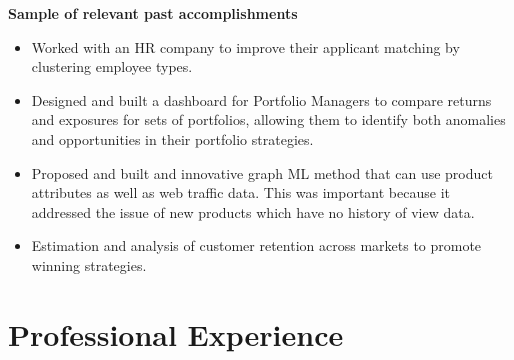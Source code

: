 \documentclass[10pt, letterpaper]{article} %
\begin{document}
\vspace{-10pt}
 {\textbf {Sample of relevant past accomplishments}}  
 \vspace{-3pt}
\begin{itemize}
\item Worked with an HR company to improve their applicant matching by clustering employee types.
\item Designed and built a dashboard for Portfolio Managers to compare returns and exposures for sets of portfolios, allowing them to identify both anomalies and opportunities in their portfolio strategies. 
 \item  Proposed and built and innovative graph ML
  method that can use product attributes as well as web traffic data.  This was important because
  it addressed the issue of new products which have no 
    history of view data.

\item Estimation and analysis of customer retention across markets to promote winning strategies. 
\end{itemize}




\vspace{3pt}



\hypertarget{professional-experience}{\section{\texorpdfstring{
{ \textbf{ {Professional Experience}}}}{Professional Experience}}\label{professional-experience}}

\end{document}
